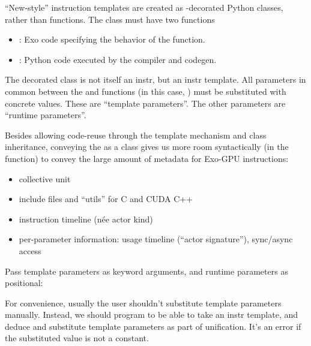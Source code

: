 ``New-style'' instruction templates are created as -decorated Python classes, rather than functions.
The class must have two functions
\begin{itemize}
  \item {}: Exo code specifying the behavior of the function.
  \item {}: Python code executed by the compiler and codegen.
\end{itemize}



\filbreak
The decorated class is not itself an instr, but an instr template.
All parameters in common between the  and  functions (in this case, ) must be substituted with concrete values.
These are ``template parameters''.
The other  parameters are ``runtime parameters''.



\filbreak
Besides allowing code-reuse through the template mechanism and class inheritance, conveying the  as a class gives us more room syntactically (in the  function) to convey the large amount of metadata for Exo-GPU instructions:
\begin{itemize}
  \item collective unit
  \filbreak
  \item include files and ``utils'' for C and CUDA C++
  \filbreak
  \item instruction timeline (n\'ee actor kind)
  \filbreak
  \item per-parameter information: usage timeline (``actor signature''), sync/async access
\end{itemize}

\filbreak
{}

Pass template parameters as keyword arguments, and runtime parameters as positional:



\filbreak
{}

For convenience, usually the user shouldn't substitute template parameters manually.
Instead, we should program  to be able to take an instr template, and deduce and substitute template parameters as part of unification.
It's an error if the substituted value is not a constant.

